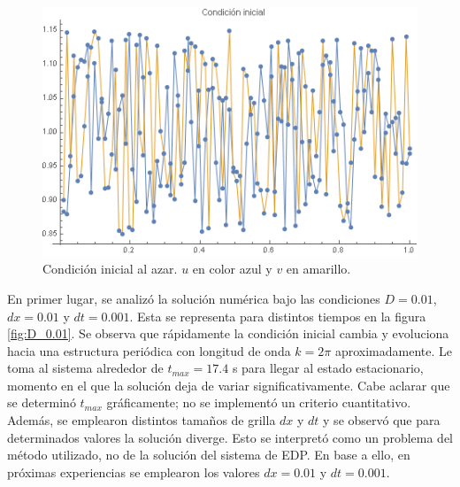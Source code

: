 \documentclass[aps,prb,twocolumn,superscriptaddress,floatfix,longbibliography]{revtex4-2}
\newcounter{para}
\begin{document}
\begin{figure}[h]
    \includegraphics[clip=true,width=\columnwidth]{cond_inic}
    \caption{Condición inicial al azar. $u$ en color azul y $v$ en amarillo.}
     \label{fig:cond_inic}
\end{figure}

En primer lugar, se analizó la solución numérica bajo las condiciones $D = 0.01$, $dx = 0.01$ y $dt = 0.001$. Esta se representa para distintos tiempos en la figura \ref{fig:D_0.01}. Se observa que rápidamente la condición inicial cambia y evoluciona hacia una estructura periódica con longitud de onda $k = 2 \pi$ aproximadamente. Le toma al sistema alrededor de $t_{max} = 17.4 $ s para llegar al estado estacionario, momento en el que la solución deja de variar significativamente. Cabe aclarar que se determinó $t_{max}$ gráficamente; no se implementó un criterio cuantitativo. Además, se emplearon distintos tamaños de grilla $dx$ y $dt$ y se observó que para determinados valores la solución diverge. Esto se interpretó como un problema del método utilizado, no de la solución del sistema de EDP. En base a ello, en próximas experiencias se emplearon los valores $dx = 0.01$ y $dt = 0.001$.
\end{document}
